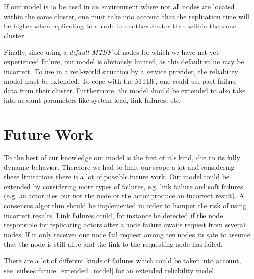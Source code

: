 \documentclass{cslthse-msc}
\begin{document}
If our model is to be used in an environment where not all nodes are located within the same cluster, one must take into account that the replication time will be higher when replicating to a node in another cluster than within the same cluster.

Finally, since using a \emph{default MTBF} of nodes for which we have not yet experienced failure, our model is obviously limited, as this default value may be incorrect. To use in a real-world situation by a service provider, the reliability model must be extended. To cope with the MTBF, one could use past failure data from their cluster. Furthermore, the model should be extended to also take into account parameters like system load, link failures, etc. 



\chapter{Future Work} \label{ch:future_work}
To the best of our knowledge our model is the first of it's kind, due to its fully dynamic behavior. Therefore we had to limit our scope a lot and considering these limitations there is a lot of possible future work. Our model could be extended by considering more types of failures, e.g. link failure and soft failures (e.g. an actor dies but not the node or the actor produce an incorrect result). A consensus algorithm should be implemented in order to hamper the risk of using incorrect results. Link failures could, for instance be detected if the node responsible for replicating actors after a node failure awaits request from several nodes. If it only receives one node fail request among ten nodes its safe to assume that the node is still alive and the link to the requesting node has failed.

There are a lot of different kinds of failures which could be taken into account, see \cref{subsec:future_extended_model} for an extended reliability model.
\end{document}
